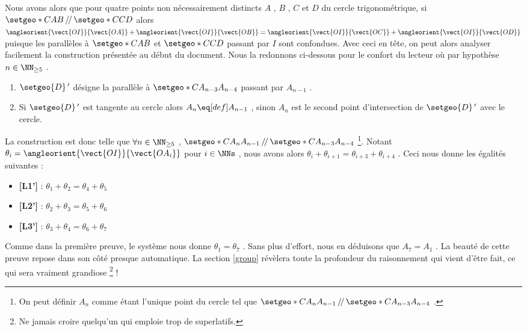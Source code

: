 \vspace{1em}


Nous avons alors que pour quatre points non nécessairement distincts $A$ , $B$ , $C$ et $D$ du cercle trigonométrique, si $\setgeo*{C}{AB} \,/\!/\,\setgeo*{C}{CD}$ alors
$\angleorient{\vect{OI}}{\vect{OA}} + \angleorient{\vect{OI}}{\vect{OB}}
=
 \angleorient{\vect{OI}}{\vect{OC}} + \angleorient{\vect{OI}}{\vect{OD}}$
puisque les parallèles à $\setgeo*{C}{AB}$ et $\setgeo*{C}{CD}$ passant par $I$ sont confondues.
Avec ceci en tête, on peut alors analyser facilement la construction présentée au début du document.
Nous la redonnons ci-dessous pour le confort du lecteur où par hypothèse $n \in \NN_{\geq 5}$ .

\begin{enumerate}
	\item $\setgeo{D}\,'$ désigne la parallèle à $\setgeo*{C}{A_{n-3} A_{n-4}}$ passant par $A_{n-1}$ .

	\item Si $\setgeo{D}\,'$ est tangente au cercle alors $A_n \eq[def] A_{n-1}$ , sinon $A_n$ est le second point d'intersection de $\setgeo{D}\,'$ avec le cercle.
\end{enumerate}


\medskip

La construction est donc telle que $\forall n \in \NN_{\geq 5}$ ,
$\setgeo*{C}{A_{n} A_{n-1}} \,/\!/\, \setgeo*{C}{A_{n-3} A_{n-4}}$
\footnote{
	On peut définir $A_{n}$ comme étant l'unique point du cercle tel que $\setgeo*{C}{A_{n} A_{n-1}} \,/\!/\, \setgeo*{C}{A_{n-3} A_{n-4}}$  .
}.
Notant $\theta_i = \angleorient{\vect{OI}}{\vect{OA_i}}$ pour $i \in \NNs$ , nous avons alors
$\theta_i + \theta_{i+1} = \theta_{i+3} + \theta_{i+4}$ . Ceci nous donne les égalités suivantes :
\begin{itemize}[label=\small\textbullet]
	\item \textbf{[L1']} :
	      $\theta_1 + \theta_{2} = \theta_{4} + \theta_{5}$

	\item \textbf{[L2']} :
	      $\theta_2 + \theta_{3} = \theta_{5} + \theta_{6}$

	\item \textbf{[L3']} :
	      $\theta_3 + \theta_{4} = \theta_{6} + \theta_{7}$
\end{itemize}


\medskip

Comme dans la première preuve, le système nous donne $\theta_1 = \theta_7$ . Sans plus d'effort, nous en déduisons que $A_7 = A_1$ . La beauté de cette preuve repose dans son côté presque automatique. La section \ref{group} révèlera toute la profondeur du raisonnement qui vient d'être fait, ce qui sera vraiment grandiose
\footnote{
	Ne jamais croire quelqu'un qui emploie trop de superlatifs.
} !
